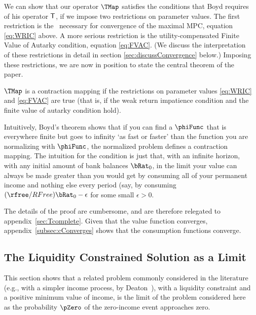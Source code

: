 \documentclass[./BufferStockTheory.tex]{subfiles}
\begin{document}
We can show that our operator $\TMap$ satisfies the conditions that
Boyd requires of his operator $\mathsf{T}$, if we impose two restrictions
on parameter values.  The first restriction is the \WRIC~necessary for
convergence of the maximal MPC, equation \eqref{eq:WRIC} above.  A
more serious restriction is the utility-compensated Finite Value of
Autarky condition, equation \eqref{eq:FVAC}.  (We discuss the
interpretation of these restrictions in detail in section
\ref{sec:discussConvergence} below.)  Imposing these restrictions, we
are now in position to state the central theorem of the paper.

\hypertarget{MainTheorem}{}
\setcounter{theorem}{0}
\begin{theorem}
  \label{thm:contmap} $\TMap$ is a contraction mapping if
  the restrictions on parameter values \eqref{eq:WRIC} and
  \eqref{eq:FVAC} are true (that is, if the weak return impatience condition and the finite value of autarky condition hold).
\end{theorem}

Intuitively, Boyd's theorem shows that if you can find a $\phiFunc$ that is everywhere finite but goes to infinity `as fast or faster' than the function you are normalizing with $\phiFunc$, the normalized problem defines a contraction mapping.  The intuition for the {\FVAC} condition is just that, with an infinite horizon, with any initial amount of bank balances $\bRat_{0}$, in the limit your value can always be made greater than you would get by consuming all of your permanent income and nothing else every period (say, by consuming $(\rfree/RFree)\bRat_{0}-\epsilon$ for some small $\epsilon>0$.

The details of the proof are cumbersome, and are therefore relegated to
appendix~\ref{sec:Tcomplete}.  Given that the value function
converges, appendix~\ref{subsec:cConverges} shows that the consumption
functions converge.

\hypertarget{The-Liquidity-Constrained-Solution-as-a-Limit}{}
\subsection{The Liquidity Constrained Solution as a Limit} \label{sec:deatonIsLimit}

This section shows that a related problem commonly considered in the
literature (e.g., with a simpler income process, by
Deaton~\citeyearpar{deatonLiqConstr}), with a liquidity constraint
and a positive minimum value of income, is the limit of the problem
considered here as the probability $\pZero$ of the zero-income event
approaches zero.
\end{document}
